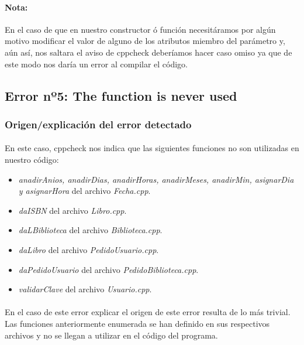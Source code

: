 		\paragraph{Nota:}En el caso de que en nuestro constructor ó función necesitáramos por algún motivo modificar el valor de alguno de los atributos miembro del parámetro y, aún así, nos saltara el aviso de cppcheck deberíamos hacer caso omiso ya que de este modo nos daría un error al compilar el código.
		
	\subsection{Error nº5: The function is never used}
		
		\subsubsection{Origen/explicación del error detectado}
		
			\paragraph{}En este caso, cppcheck nos indica que las siguientes funciones no son utilizadas en nuestro código:
			
			\begin{itemize}
				\item \textit{anadirAnios, anadirDias, anadirHoras, anadirMeses, anadirMin, asignarDia y asignarHora} del archivo \textit{Fecha.cpp}.
				\item \textit{daISBN} del archivo \textit{Libro.cpp}.
				\item \textit{daLBiblioteca} del archivo \textit{Biblioteca.cpp}.
				\item \textit{daLibro} del archivo \textit{PedidoUsuario.cpp}.
				\item \textit{daPedidoUsuario} del archivo \textit{PedidoBiblioteca.cpp}.
				\item \textit{validarClave} del archivo \textit{Usuario.cpp}.
			\end{itemize}
		
			\paragraph{}En el caso de este error explicar el origen de este error resulta de lo más trivial. Las funciones anteriormente enumerada se han definido en sus respectivos archivos y no se llegan a utilizar en el código del programa.
			

